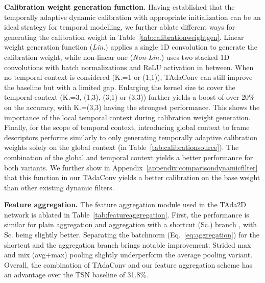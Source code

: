 \documentclass{article} \usepackage{iclr2022_conference,times}
\begin{document}
\textbf{Calibration weight generation function. } 
Having established that the temporally adaptive dynamic calibration with appropriate initialization can be an ideal strategy for temporal modelling, we further ablate different ways for generating the calibration weight in Table~\ref{tab:calibrationweightgen}. 
Linear weight generation function (\textit{Lin.}) applies a single 1D convolution to generate the calibration weight, while non-linear one (\textit{Non-Lin.}) uses two stacked 1D convolutions with batch normalizations and ReLU activation in between. 
When no temporal context is considered (K.=1 or (1,1)), TAdaConv can still improve the baseline but with a limited gap.
Enlarging the kernel size to cover the temporal context (K.=3, (1,3), (3,1) or (3,3)) further yields a boost of over 20\% on the accuracy, with K.=(3,3) having the strongest performance.
This shows the importance of the local temporal context during calibration weight generation.
Finally, for the scope of temporal context, introducing global context to frame descriptors performs similarly to only generating temporally adaptive calibration weights solely on the global context (in Table~\ref{tab:calibrationsource}). 
The combination of the global and temporal context yields a better performance for both variants.
We further show in Appendix~\ref{appendix:comparisondynamicfilter} that this function in our TAdaConv yields a better calibration on the base weight than other existing dynamic filters.

\textbf{Feature aggregation. }The feature aggregation module used in the TAda2D network is ablated in Table~\ref{tab:featureaggregation}. First, the performance is similar for plain aggregation  and aggregation with a shortcut (Sc.) branch , with Sc. being slightly better. Separating the batchnorm (Eq.~\ref{eq:aggregation}) for the shortcut and the aggregation branch brings notable improvement.
Strided max and mix (avg+max) pooling slightly underperform the average pooling variant. 
Overall, the combination of TAdaConv and our feature aggregation scheme has an advantage over the TSN baseline of 31.8\%. 
\end{document}
